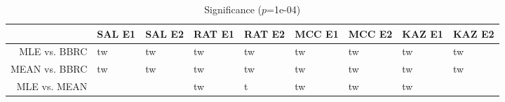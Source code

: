 \begin{table}[t]
\begin{center}
\begin{tabular}{rllllllll}
  \hline
 & SAL E1 & SAL E2 & RAT E1 & RAT E2 & MCC E1 & MCC E2 & KAZ E1 & KAZ E2 \\ 
  \hline
MLE vs. BBRC & tw & tw & tw & tw & tw & tw & tw & tw \\ 
  MEAN vs. BBRC & tw & tw & tw & tw & tw & tw & tw & tw \\ 
  MLE vs. MEAN &  &  & tw & t & tw & tw & tw &  \\ 
   \hline
\end{tabular}
\caption{Significance ($p$=1e-04)}
\label{t:sign}
\end{center}
\end{table}
